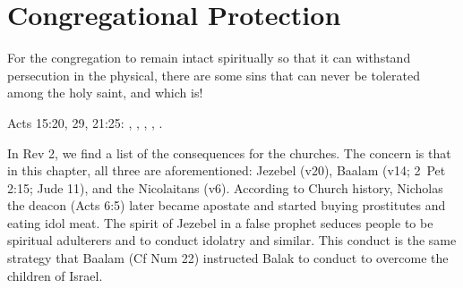 \section{Congregational Protection}

For the congregation to remain intact spiritually so that it can withstand persecution in the physical, there are some sins that can never be tolerated among the holy saint, and which is!

Acts 15:20, 29, 21:25: , , , , .

In Rev 2, we find a list of the consequences for the churches. The concern is that in this chapter, all three are aforementioned: Jezebel (v20), Baalam (v14; 2~Pet 2:15; Jude 11), and the Nicolaitans (v6). According to Church history, Nicholas the deacon (Acts 6:5) later became apostate and started buying prostitutes and eating idol meat. The spirit of Jezebel in a false prophet seduces people to be spiritual adulterers and to conduct idolatry and similar. This conduct is the same strategy that Baalam (Cf Num 22) instructed Balak to conduct to overcome the children of Israel.
